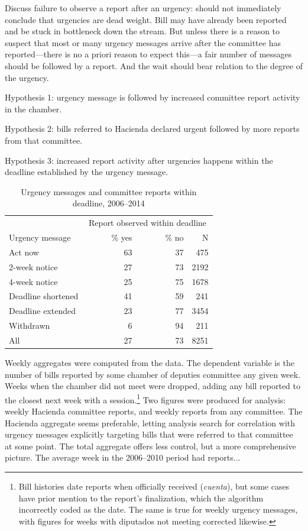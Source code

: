 \documentclass[letter,12pt]{article}
\newcommand{\mc}{\multicolumn}
\begin{document}
Discuss failure to observe a report after an urgency: should not immediately conclude that urgencies are dead weight. Bill may have already been reported and be stuck in bottleneck down the stream. But unless there is a reason to suspect that most or many  urgency messages arrive after the committee has reported---there is no a priori reason to expect this---a fair number of messages should be followed by a report. And the wait should bear relation to the degree of the urgency. 

Hypothesis 1: urgency message is followed by increased committee report activity in the chamber. 

Hypothesis 2: bills referred to Hacienda declared urgent followed by more reports from that committee.

Hypothesis 3: increased report activity after urgencies happens within the deadline established by the urgency message.


\begin{table}
\begin{center}
\begin{tabular}{lrrr}
                    &  \mc{3}{c}{Report observed within deadline} \\
Urgency message     &  ~~~~~~\% yes  &  ~~~~~~\% no   &  N     \\ \hline
Act now             &  63      &  37      &  475   \\
2-week notice       &  27      &  73      &  2192  \\
4-week notice       &  25      &  75      &  1678  \\
Deadline shortened  &  41      &  59      &  241   \\
Deadline extended   &  23      &  77      &  3454  \\
Withdrawn           &  6       &  94      &  211   \\ \hline
All                 &  27      &  73      &  8251  \\
\end{tabular}
\caption{Urgency messages and committee reports within deadline, 2006--2014}
\end{center}
\end{table}

Weekly aggregates were computed from the data. The dependent variable is the number of bills reported by some chamber of deputies committee any given week. Weeks when the chamber did not meet were dropped, adding any bill reported to the closest next week with a session.\footnote{Bill histories date reports when officially received (\emph{cuenta}), but some cases have prior mention to the report's finalization, which the algorithm incorrectly coded as the date. The same is true for weekly urgency messages, with figures for weeks with diputados not meeting corrected likewise.} Two figures were produced for analysis: weekly Hacienda committee reports, and weekly reports from any committee. The Hacienda aggregate seems preferable, letting analysis search for correlation with urgency messages explicitly targeting bills that were referred to that committee at some point. The total aggregate offers less control, but a more comprehensive picture. The average week in the 2006--2010 period had reports...
\end{document}
